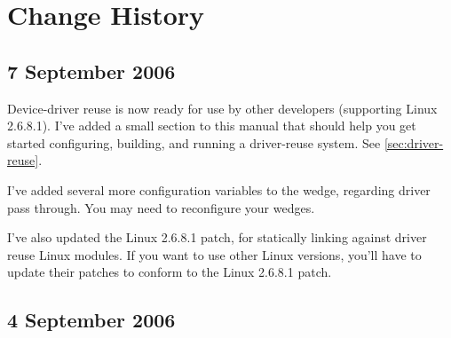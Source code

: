 \documentclass[10pt,a4paper]{article}
\title{\mytitle}
\author{\myname}
\begin{document}
\maketitle
\tableofcontents

\section{Change History}

\subsection*{7 September 2006}

Device-driver reuse is now ready for use by other developers
(supporting Linux 2.6.8.1).  I've
added a small section to this manual that should help you get started
configuring, building, and running a driver-reuse system.  See
\autoref{sec:driver-reuse}.

I've added several more configuration variables to the
wedge, regarding driver pass through.  You may need to reconfigure your
wedges.

I've also updated the Linux 2.6.8.1 patch, for statically linking
against driver reuse Linux modules.  If you want to use other Linux
versions, you'll have to update their patches to conform to the Linux
2.6.8.1 patch.

\subsection*{4 September 2006}
\end{document}
